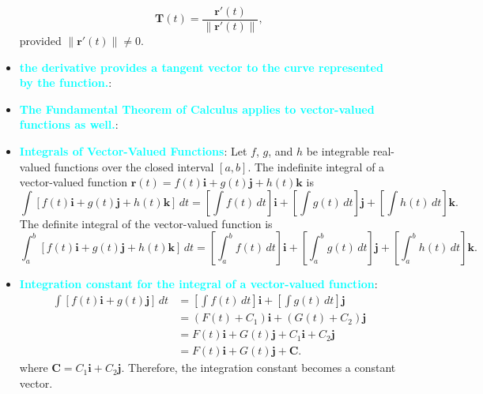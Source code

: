 \documentclass{report}
\begin{document}
\begin{itemize}
           \begin{equation}
               \mathbf{T}(t) = \frac{\mathbf{r}'(t)}{\|\mathbf{r}'(t)\|},
           \end{equation}
           provided $\|\mathbf{r}'(t)\| \neq 0.$
        \item \textbf{\textcolor{cyan}{the derivative provides a tangent vector to the curve represented by the function.}}: 
        \item \textbf{\textcolor{cyan}{The Fundamental Theorem of Calculus applies to vector-valued functions as well.}}:
        \item \textbf{\textcolor{cyan}{Integrals of Vector-Valued Functions}}:
            Let $f$, $g$, and $h$ be integrable real-valued functions over the closed interval $[a,b]$.
            The indefinite integral of a vector-valued function $\mathbf{r}(t) = f(t)\mathbf{i} + g(t)\mathbf{j} + h(t)\mathbf{k}$ is
            \begin{equation}
                \int [f(t)\mathbf{i} + g(t)\mathbf{j} + h(t)\mathbf{k}] \, dt = \left[ \int f(t) \, dt \right]\mathbf{i} + \left[ \int g(t) \, dt \right]\mathbf{j} + \left[ \int h(t) \, dt \right]\mathbf{k}.
            \end{equation}
            The definite integral of the vector-valued function is
            \begin{equation}
                \int_a^b [f(t)\mathbf{i} + g(t)\mathbf{j} + h(t)\mathbf{k}] \, dt = \left[ \int_a^b f(t) \, dt \right]\mathbf{i} + \left[ \int_a^b g(t) \, dt \right]\mathbf{j} + \left[ \int_a^b h(t) \, dt \right]\mathbf{k}.
            \end{equation}
        \item \textbf{\textcolor{cyan}{Integration constant for the integral of a vector-valued function}}:
            \begin{align*}
                \int [f(t)\mathbf{i} + g(t)\mathbf{j}] \, dt &= \left[ \int f(t) \, dt \right]\mathbf{i} + \left[ \int g(t) \, dt \right]\mathbf{j} \\
                &= (F(t) + C_1)\mathbf{i} + (G(t) + C_2)\mathbf{j} \\
                &= F(t)\mathbf{i} + G(t)\mathbf{j} + C_1\mathbf{i} + C_2\mathbf{j} \\
                &= F(t)\mathbf{i} + G(t)\mathbf{j} + \mathbf{C}
            .\end{align*}
            where $\mathbf{C} = C_1\mathbf{i} + C_2\mathbf{j}$. Therefore, the integration constant becomes a constant vector.

\end{itemize}
\end{document}

